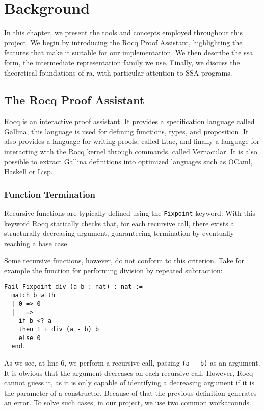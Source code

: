 
\chapter{Background}
\label{cha:background}

In this chapter, we present the tools and concepts employed throughout this project. We begin by introducing the Rocq Proof Assistant, highlighting the features that make it suitable for our implementation. We then describe the \gls{ssa} form, the intermediate representation family we use. Finally, we discuss the theoretical foundations of \gls{ra}, with particular attention to SSA programs.

\section{The Rocq Proof Assistant}

Rocq is an interactive proof assistant. It provides a specification language called Gallina, this language is used for defining functions, types, and proposition. It also provides a language for writing proofs, called Ltac, and finally a language for interacting with the Rocq kernel through commands, called Vernacular. It is also possible to extract Gallina definitions into optimized languages such as OCaml, Haskell or Lisp.

\subsection{Function Termination}
\label{subsec:funterm}

Recursive functions are typically defined using the \texttt{Fixpoint} keyword. With this keyword Rocq statically checks that, for each recursive call, there exists a structurally decreasing argument, guaranteeing termination by eventually reaching a base case.

Some recursive functions, however, do not conform to this criterion. Take for example the function for performing division by repeated subtraction:

\begin{lstlisting}[style=Rocq]
Fail Fixpoint div (a b : nat) : nat :=
  match b with
  | 0 => 0
  | _ =>
    if b <? a
    then 1 + div (a - b) b
    else 0
  end.
\end{lstlisting}

As we see, at line 6, we perform a recursive call, passing \texttt{(a - b)} as an argument. It is obvious that the argument decreases on each recursive call. However, Rocq cannot guess it, as it is only capable of identifying a decreasing argument if it is the parameter of a constructor. Because of that the previous definition generates an error.
To solve such cases, in our project, we use two common workarounds.


